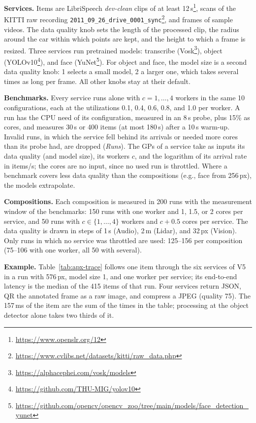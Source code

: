 \noindent
\textbf{Services.}
%
Items are LibriSpeech \textit{dev-clean} clips of at least 12\,s\footnote{\url{https://www.openslr.org/12}}, scans of the KITTI raw recording \texttt{2011\_09\_26\_drive\_0001\_sync}\footnote{\url{https://www.cvlibs.net/datasets/kitti/raw_data.php}}, and frames of sample videos. The data quality knob sets the length of the processed clip, the radius around the car within which points are kept, and the height to which a frame is resized. Three services run pretrained models: transcribe (Vosk\footnote{\url{https://alphacephei.com/vosk/models}}), object (YOLOv10\footnote{\url{https://github.com/THU-MIG/yolov10}}), and face (YuNet\footnote{\url{https://github.com/opencv/opencv_zoo/tree/main/models/face_detection_yunet}}). For object and face, the model size is a second data quality knob: 1 selects a small model, 2 a larger one, which takes several times as long per frame. All other knobs stay at their default.

\vspace{3pt}
\noindent
\textbf{Benchmarks.}
%
Every service runs alone with $c = 1, \dots, 4$ workers in the same 10 configurations, each at the utilizations 0.1, 0.4, 0.6, 0.8, and 1.0 per worker. A run has the CPU need of its configuration, measured in an 8\,s probe, plus 15\% as cores, and measures 30\,s or 400 items (at most 180\,s) after a 10\,s warm-up. Invalid runs, in which the service fell behind its arrivals or needed more cores than its probe had, are dropped (\textit{Runs}). The GPs of a service take as inputs its data quality (and model size), its workers $c$, and the logarithm of its arrival rate in items/s; the cores are no input, since no used run is throttled. Where a benchmark covers less data quality than the compositions (e.g., face from 256\,px), the models extrapolate.

\vspace{3pt}
\noindent
\textbf{Compositions.}
%
Each composition is measured in 200 runs with the measurement window of the benchmarks: 150 runs with one worker and 1, 1.5, or 2 cores per service, and 50 runs with $c \in \{1, \dots, 4\}$ workers and $c + 0.5$ cores per service. The data quality is drawn in steps of 1\,s (Audio), 2\,m (Lidar), and 32\,px (Vision). Only runs in which no service was throttled are used: 125--156 per composition (75--106 with one worker, all 50 with several).

\vspace{3pt}
\noindent
\textbf{Example.}
%
Table~\ref{tab:apx-trace} follows one item through the six services of V5 in a run with 576\,px, model size 1, and one worker per service; its end-to-end latency is the median of the 415 items of that run. Four services return JSON, QR the annotated frame as a raw image, and compress a JPEG (quality 75). The 157\,ms of the item are the sum of the times in the table; processing at the object detector alone takes two thirds of it.

